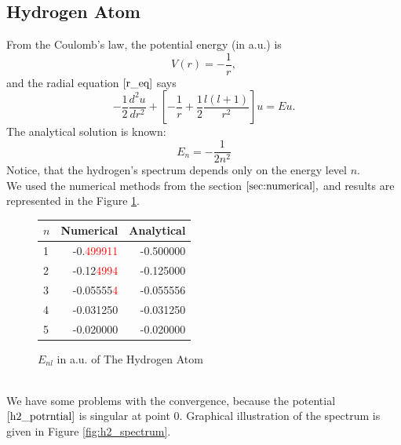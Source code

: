 \documentclass[a4paper, 11pt]{article}
\begin{document}
\subsection{Hydrogen Atom}
From the Coulomb's law, the potential energy (in a.u.) is 
\begin{equation}\label{h2_potrntial}
	V(r) = -\frac{1}{r},
\end{equation}
and the radial equation $\eqref{r_eq}$  says
$$-\frac{1}{2}\frac{d^2 u}{dr^2}+[-\frac{1}{r}+\frac{1}{2}\frac{l(l+1)}{r^2}]u = Eu.$$
The analytical solution is known:
\begin{equation}\label{h2_sol}
   E_n = -\frac{1}{2 n^2}
\end{equation}
Notice, that the hydrogen's spectrum depends only on the energy level $n$.\\
We used the numerical methods from the section $\ref{sec:numerical},$ and results are represented in the Figure \ref{fig:h2_bar}.
\begin{figure}[h!]
\centering
\begin{tabular}{lrr}
\toprule
\centering
$n$ &         Numerical &         Analytical \\
\midrule
1 & -0.\textcolor{red}{499911} & -0.500000 \\
2 & -0.12\textcolor{red}{4994} & -0.125000 \\
3 & -0.05555\textcolor{red}{4} & -0.055556 \\
4 & -0.031250 & -0.031250 \\
5 & -0.020000 & -0.020000 \\
\bottomrule
\end{tabular}
\caption{$E_{nl}$ in a.u. of The Hydrogen Atom}
\label{fig:h2_bar}
\end{figure}\\
We have some problems with the convergence, because the potential $\eqref{h2_potrntial}$ is singular at point 0. Graphical illustration of the spectrum is given in Figure \ref{fig:h2_spectrum}.
\end{document}
